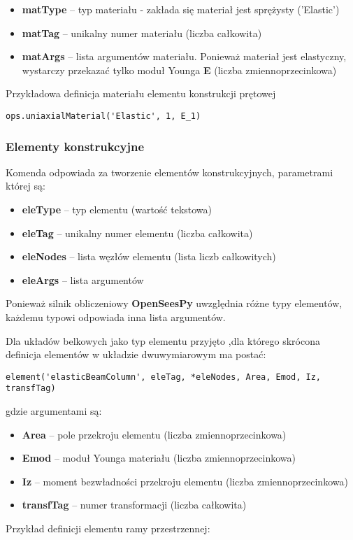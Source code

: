 \begin{itemize}
    \item \textbf{matType} – typ materiału - zakłada się materiał jest sprężysty ('Elastic')
    \item \textbf{matTag} – unikalny numer materiału (liczba całkowita)
    \item \textbf{matArgs} – lista argumentów materiału. Ponieważ materiał jest elastyczny, wystarczy przekazać tylko moduł Younga \textbf{E} (liczba zmiennoprzecinkowa)
\end{itemize}

Przykładowa definicja materiału elementu konstrukcji prętowej

\begin{lstlisting}
ops.uniaxialMaterial('Elastic', 1, E_1)
\end{lstlisting}

\subsubsection*{Elementy konstrukcyjne}

Komenda  odpowiada za tworzenie elementów konstrukcyjnych, parametrami której są:

\begin{itemize}
    \item \textbf{eleType} – typ elementu (wartość tekstowa)
    \item \textbf{eleTag} – unikalny numer elementu (liczba całkowita)
    \item \textbf{eleNodes} – lista węzłów elementu (lista liczb całkowitych)
    \item \textbf{eleArgs} – lista argumentów
\end{itemize}

Ponieważ silnik obliczeniowy \textbf{OpenSeesPy} uwzględnia różne typy elementów, każdemu typowi odpowiada inna lista argumentów.

Dla układów belkowych jako typ elementu przyjęto ,dla którego skrócona definicja elementów w układzie dwuwymiarowym ma postać:

\begin{lstlisting}
element('elasticBeamColumn', eleTag, *eleNodes, Area, Emod, Iz, transfTag)
\end{lstlisting}
gdzie argumentami są:
\begin{itemize}
    \item \textbf{Area} – pole przekroju elementu (liczba zmiennoprzecinkowa)
    \item \textbf{Emod} – moduł Younga materiału (liczba zmiennoprzecinkowa)
    \item \textbf{Iz} – moment bezwładności przekroju elementu (liczba zmiennoprzecinkowa)
    \item \textbf{transfTag} – numer transformacji (liczba całkowita)
\end{itemize}
Przykład definicji elementu ramy przestrzennej:

